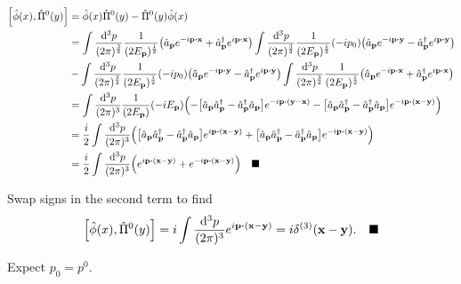 \documentclass{article}
\begin{document}
\begin{align*}
    \bqty{\hat{\phi}(x),\hat{\Pi}^0(y)} & =\hat{\phi}(x)\hat{\Pi}^0(y)-\hat{\Pi}^0(y)\hat{\phi}(x)                                                                                                                                                                                                                                                                                                         \\
                                        & =\int\frac{\dd[3]{p}}{(2\pi)^{\frac{3}{2}}}\frac{1}{(2E_{\vb{p}})^{\frac{1}{2}}}\pqty{\hat{a}_{\vb{p}}e^{-i\vb{p}\vdot\vb{x}}+\hat{a}^\dagger_{\vb{p}}e^{i\vb{p}\vdot\vb{x}}}\int\frac{\dd[3]{p}}{(2\pi)^{\frac{3}{2}}}\frac{1}{(2E_{\vb{p}})^{\frac{1}{2}}}(-ip_0)\pqty{\hat{a}_{\vb{p}}e^{-i\vb{p}\vdot\vb{y}}-\hat{a}^\dagger_{\vb{p}}e^{i\vb{p}\vdot\vb{y}}} \\
                                        & -\int\frac{\dd[3]{p}}{(2\pi)^{\frac{3}{2}}}\frac{1}{(2E_{\vb{p}})^{\frac{1}{2}}}(-ip_0)\pqty{\hat{a}_{\vb{p}}e^{-i\vb{p}\vdot\vb{y}}-\hat{a}^\dagger_{\vb{p}}e^{i\vb{p}\vdot\vb{y}}}\int\frac{\dd[3]{p}}{(2\pi)^{\frac{3}{2}}}\frac{1}{(2E_{\vb{p}})^{\frac{1}{2}}}\pqty{\hat{a}_{\vb{p}}e^{-i\vb{p}\vdot\vb{x}}+\hat{a}^\dagger_{\vb{p}}e^{i\vb{p}\vdot\vb{x}}} \\
                                        & =\int\frac{\dd[3]{p}}{(2\pi)^3}\frac{1}{(2E_{\vb{p}})}(-iE_{\vb{p}})\pqty{-\bqty{\hat{a}_{\vb{p}}\hat{a}^\dagger_{\vb{p}}-\hat{a}^\dagger_{\vb{p}}\hat{a}_{\vb{p}}}e^{-i\vb{p}\vdot\pqty{\vb{y}-\vb{x}}}-\bqty{\hat{a}_{\vb{p}}\hat{a}^\dagger_{\vb{p}}-\hat{a}^\dagger_{\vb{p}}\hat{a}_{\vb{p}}}e^{-i\vb{p}\vdot\pqty{\vb{x}-\vb{y}}}}                          \\
                                        & =\frac{i}{2}\int\frac{\dd[3]{p}}{(2\pi)^3}\pqty{\bqty{\hat{a}_{\vb{p}}\hat{a}^\dagger_{\vb{p}}-\hat{a}^\dagger_{\vb{p}}\hat{a}_{\vb{p}}}e^{i\vb{p}\vdot\pqty{\vb{x}-\vb{y}}}+\bqty{\hat{a}_{\vb{p}}\hat{a}^\dagger_{\vb{p}}-\hat{a}^\dagger_{\vb{p}}\hat{a}_{\vb{p}}}e^{-i\vb{p}\vdot\pqty{\vb{x}-\vb{y}}}}                                                      \\
                                        & =\frac{i}{2}\int\frac{\dd[3]{p}}{(2\pi)^3}\pqty{e^{i\vb{p}\vdot\pqty{\vb{x}-\vb{y}}}+e^{-i\vb{p}\vdot\pqty{\vb{x}-\vb{y}}}}\quad\blacksquare                                                                                                                                                                                                                     \\
\end{align*}

Swap signs in the second term to find \[\bqty{\hat{\phi}(x),\hat{\Pi}^0(y)}=i\int\frac{\dd[3]{p}}{(2\pi)^3}e^{i\vb{p}\vdot\pqty{\vb{x}-\vb{y}}}=i\delta^{(3)}\pqty{\vb{x}-\vb{y}}.\quad\blacksquare\]

Expect $p_0=p^0$.
\end{document}
